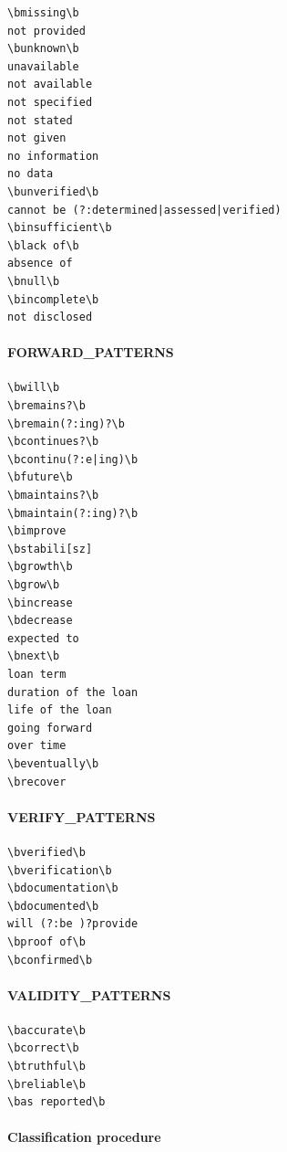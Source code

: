 \begin{scriptsize}\begin{verbatim}
\bmissing\b
not provided
\bunknown\b
unavailable
not available
not specified
not stated
not given
no information
no data
\bunverified\b
cannot be (?:determined|assessed|verified)
\binsufficient\b
\black of\b
absence of
\bnull\b
\bincomplete\b
not disclosed
\end{verbatim}\end{scriptsize}


\paragraph{FORWARD\_PATTERNS}

\begin{scriptsize}\begin{verbatim}
\bwill\b
\bremains?\b
\bremain(?:ing)?\b
\bcontinues?\b
\bcontinu(?:e|ing)\b
\bfuture\b
\bmaintains?\b
\bmaintain(?:ing)?\b
\bimprove
\bstabili[sz]
\bgrowth\b
\bgrow\b
\bincrease
\bdecrease
expected to
\bnext\b
loan term
duration of the loan
life of the loan
going forward
over time
\beventually\b
\brecover
\end{verbatim}\end{scriptsize}


\paragraph{VERIFY\_PATTERNS}

\begin{scriptsize}\begin{verbatim}
\bverified\b
\bverification\b
\bdocumentation\b
\bdocumented\b
will (?:be )?provide
\bproof of\b
\bconfirmed\b
\end{verbatim}\end{scriptsize}


\paragraph{VALIDITY\_PATTERNS}

\begin{scriptsize}\begin{verbatim}
\baccurate\b
\bcorrect\b
\btruthful\b
\breliable\b
\bas reported\b
\end{verbatim}\end{scriptsize}


\paragraph{Classification procedure}

